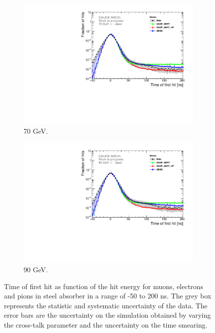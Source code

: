 \begin{figure}[htbp!]
\begin{subfigure}[t]{0.49\textwidth}
    \includegraphics[width=1\textwidth]{../Thesis_Plots/Timing/Pions/Plots/Comparison_SimData_Pion70GeV_LateClusters.pdf}
    \caption{70 GeV.} \label{fig:dNdt_SimData_70GeV}
  \end{subfigure}
  \hfill
  \begin{subfigure}[t]{0.49\textwidth}
    \centering
    \includegraphics[width=1\textwidth]{../Thesis_Plots/Timing/Pions/Plots/Comparison_SimData_Pion90GeV_LateClusters.pdf}
    \caption{90 GeV.} \label{fig:dNdt_SimData_90GeV}
  \end{subfigure}
  \caption{Time of first hit as function of the hit energy for muons, electrons and pions in steel absorber in a range of -50 to 200 ns. The grey box represents the statistic and systematic uncertainty of the data. The error bars are the uncertainty on the \mokka simulation obtained by varying the cross-talk parameter and the uncertainty on the time smearing.}
\end{figure}

